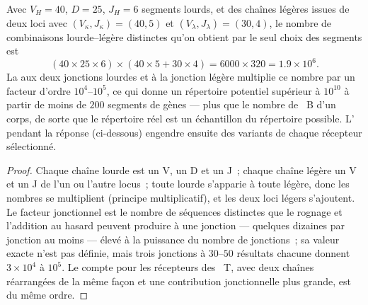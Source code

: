 \begin{theorem}\label{thm:b3:adaptive-immunity:repertoire}
Avec $V_{H} = 40$, $D = 25$, $J_{H} = 6$ segments lourds, et des chaînes
légères issues de deux loci avec $(V_{\kappa}, J_{\kappa}) = (40, 5)$ et
$(V_{\lambda}, J_{\lambda}) = (30, 4)$, le nombre de combinaisons
lourde--légère distinctes qu'on obtient par le seul choix des segments
est
\[
(40\times 25\times 6)\times(40\times 5 + 30\times 4) = 6000\times 320
= 1.9\times 10^{6}.
\]
La  aux deux jonctions lourdes et à la jonction
légère multiplie ce nombre par un facteur d'ordre $10^{4}$--$10^{5}$, ce
qui donne un répertoire potentiel supérieur à $10^{10}$ à partir de
moins de $200$ segments de gènes --- plus que le nombre de
~B d'un corps, de sorte que le répertoire réel est un
échantillon du répertoire possible. L' pendant la
réponse (ci-dessous) engendre ensuite des variants de chaque récepteur
sélectionné.
\end{theorem}
\begin{proof}
Chaque chaîne lourde est un V, un D et un J~; chaque chaîne légère un V
et un J de l'un ou l'autre locus~; toute lourde s'apparie à toute
légère, donc les nombres se multiplient (principe multiplicatif), et les
deux loci légers s'ajoutent. Le facteur jonctionnel est le nombre de
séquences distinctes que le rognage et l'addition au hasard peuvent
produire à une jonction --- quelques dizaines par jonction au moins ---
élevé à la puissance du nombre de jonctions~; sa valeur exacte n'est pas
définie, mais trois jonctions à $30$--$50$ résultats chacune donnent
$3\times 10^{4}$ à $10^{5}$. Le compte pour les récepteurs des
~T, avec deux chaînes réarrangées de la même façon et une
contribution jonctionnelle plus grande, est du même ordre.
\end{proof}

